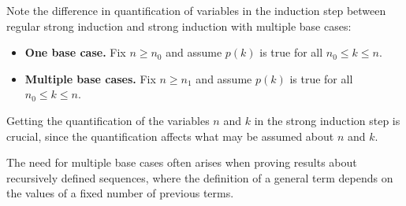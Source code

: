 Note the difference in quantification of variables in the induction step between regular strong induction and strong induction with multiple base cases:
\begin{itemize}
\item \textbf{One base case.} Fix $n \ge \boxed{n_0}$ and assume $p(k)$ is true for all $\boxed{n_0} \le k \le n$.
\item \textbf{Multiple base cases.} Fix $n \ge \boxed{n_1}$ and assume $p(k)$ is true for all $\boxed{n_0} \le k \le n$.
\end{itemize}

Getting the quantification of the variables $n$ and $k$ in the strong induction step is crucial, since the quantification affects what may be assumed about $n$ and $k$.

The need for multiple base cases often arises when proving results about recursively defined sequences, where the definition of a general term depends on the values of a fixed number of previous terms.


